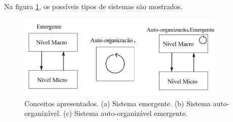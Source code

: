 Na figura \ref{fig:conceps}, os possíveis tipos de sistemas são mostrados. 


\begin{figure}
 \centering
 \includegraphics[width=10cm]{pictures/concepts.png}
 \caption{Conceitos apresentados. (a) Sistema emergente. (b) Sistema auto-organizável. (c) Sistema auto-organizável emergente.}
 \label{fig:conceps}
\end{figure}


